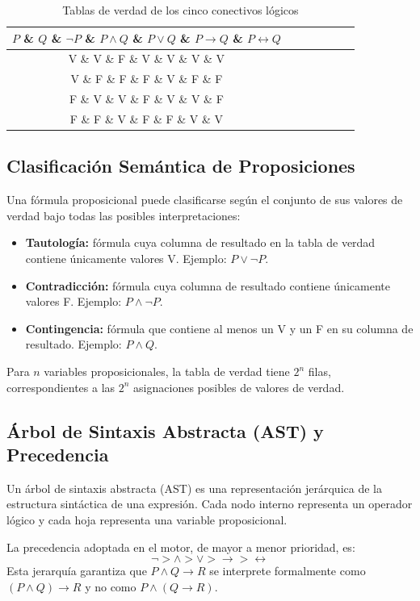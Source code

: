 \documentclass[11pt,a4paper]{article}
\begin{document}
\begin{table}[H]
\centering
\caption{Tablas de verdad de los cinco conectivos lógicos}
\label{tab:conectivos}
\small
\begin{tabular}{ccccccc}
\toprule
$P$ \& $Q$ \& $\neg P$ \& $P \land Q$ \& $P \lor Q$ \& $P \to Q$ \& $P \leftrightarrow Q$ \\
\midrule
V \& V \& F \& V \& V \& V \& V \\
V \& F \& F \& F \& V \& F \& F \\
F \& V \& V \& F \& V \& V \& F \\
F \& F \& V \& F \& F \& V \& V \\
\bottomrule
\end{tabular}
\end{table}

\subsection{Clasificación Semántica de Proposiciones}
Una fórmula proposicional puede clasificarse según el conjunto de sus valores de verdad bajo todas las posibles interpretaciones:
\begin{itemize}[leftmargin=*]
  \item \textbf{Tautología:} fórmula cuya columna de resultado en la tabla de verdad contiene únicamente valores V. Ejemplo: $P \lor \neg P$.
  \item \textbf{Contradicción:} fórmula cuya columna de resultado contiene únicamente valores F. Ejemplo: $P \land \neg P$.
  \item \textbf{Contingencia:} fórmula que contiene al menos un V y un F en su columna de resultado. Ejemplo: $P \land Q$.
\end{itemize}
Para $n$ variables proposicionales, la tabla de verdad tiene $2^n$ filas, correspondientes a las $2^n$ asignaciones posibles de valores de verdad.

\subsection{Árbol de Sintaxis Abstracta (AST) y Precedencia}
Un árbol de sintaxis abstracta (AST) es una representación jerárquica de la estructura sintáctica de una expresión. Cada nodo interno representa un operador lógico y cada hoja representa una variable proposicional.

La precedencia adoptada en el motor, de mayor a menor prioridad, es:
$$\neg > \land > \lor > \to > \leftrightarrow$$
Esta jerarquía garantiza que $P \land Q \to R$ se interprete formalmente como $(P \land Q) \to R$ y no como $P \land (Q \to R)$.
\end{document}
